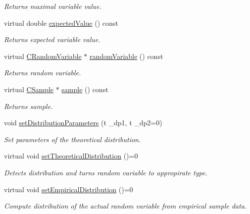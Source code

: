 \begin{DoxyCompactItemize}
\begin{DoxyCompactList}\small\item\em Returns maximal variable value. \end{DoxyCompactList}\item 
virtual double \hyperlink{class_go_s_u_m_1_1_t_model_variable_a6bdec5497c51d855daccf9033927b8bc}{expected\-Value} () const 
\begin{DoxyCompactList}\small\item\em Returns expected variable value. \end{DoxyCompactList}\item 
virtual \hyperlink{class_c_random_variable}{C\-Random\-Variable} $\ast$ \hyperlink{class_go_s_u_m_1_1_t_model_variable_a8d74a8298078d6d99f62da8ea096e359}{random\-Variable} () const 
\begin{DoxyCompactList}\small\item\em Returns random variable. \end{DoxyCompactList}\item 
virtual \hyperlink{class_c_sample}{C\-Sample} $\ast$ \hyperlink{class_go_s_u_m_1_1_t_model_variable_ad7699e50c6f2a7b67ff9e178fe1af740}{sample} () const 
\begin{DoxyCompactList}\small\item\em Returns sample. \end{DoxyCompactList}\item 
void \hyperlink{class_go_s_u_m_1_1_t_model_variable_a22b3e3106bba45b0ef22bf7fcaedb090}{set\-Distribution\-Parameters} (t \-\_\-dp1, t \-\_\-dp2=0)
\begin{DoxyCompactList}\small\item\em Set parameters of the theoretical distribution. \end{DoxyCompactList}\item 
virtual void \hyperlink{class_go_s_u_m_1_1_t_model_variable_ad113f33f216796f775855dd3f8553f03}{set\-Theoretical\-Distribution} ()=0
\begin{DoxyCompactList}\small\item\em Detects distribution and turns random variable to appropirate type. \end{DoxyCompactList}\item 
virtual void \hyperlink{class_go_s_u_m_1_1_t_model_variable_a3128d12e3ce0757714a7596de087314e}{set\-Empirical\-Distribution} ()=0
\begin{DoxyCompactList}\small\item\em Compute distribution of the actual random variable from empirical sample data. \end{DoxyCompactList}\item 

\end{DoxyCompactItemize}

